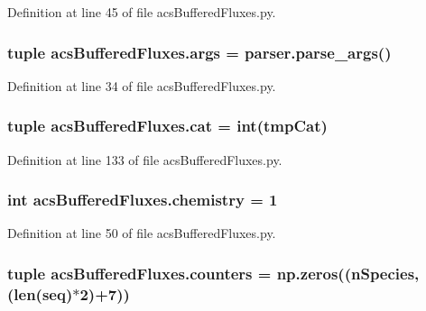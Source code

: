 Definition at line 45 of file acs\-Buffered\-Fluxes.\-py.

\hypertarget{a00092_afa2d0b9fb021746e05cd06277997da04}{
\subsubsection[{args}]{\setlength{\rightskip}{0pt plus 5cm}tuple acs\-Buffered\-Fluxes.\-args = parser.\-parse\-\_\-args()}}\label{a00092_afa2d0b9fb021746e05cd06277997da04}


Definition at line 34 of file acs\-Buffered\-Fluxes.\-py.

\hypertarget{a00092_ad351972f8ea18b9bf9b58f572c84534e}{
\subsubsection[{cat}]{\setlength{\rightskip}{0pt plus 5cm}tuple acs\-Buffered\-Fluxes.\-cat = int(tmp\-Cat)}}\label{a00092_ad351972f8ea18b9bf9b58f572c84534e}


Definition at line 133 of file acs\-Buffered\-Fluxes.\-py.

\hypertarget{a00092_ab4fd705796fd835a4238fecdc3caf76e}{
\subsubsection[{chemistry}]{\setlength{\rightskip}{0pt plus 5cm}int acs\-Buffered\-Fluxes.\-chemistry = 1}}\label{a00092_ab4fd705796fd835a4238fecdc3caf76e}


Definition at line 50 of file acs\-Buffered\-Fluxes.\-py.

\hypertarget{a00092_ab6476d4caeb73c29cf068374a1c8285d}{
\subsubsection[{counters}]{\setlength{\rightskip}{0pt plus 5cm}tuple acs\-Buffered\-Fluxes.\-counters = np.\-zeros((n\-Species,(len(seq)$\ast$2)+7))}}\label{a00092_ab6476d4caeb73c29cf068374a1c8285d}


